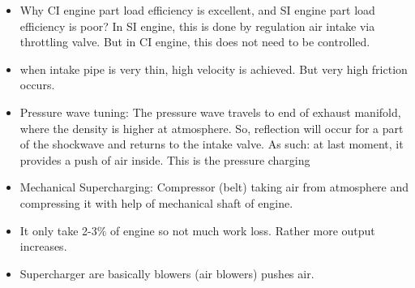 \documentclass{article}
\begin{document}
\begin{multicols}{2}
\begin{itemize}
    \item Why CI engine part load efficiency is excellent, and SI engine part load efficiency is poor? In SI engine, this is done by regulation air intake via throttling valve. But in CI engine, this does not need to be controlled.
    \item when intake pipe is very thin, high velocity is achieved. But very high friction occurs.
    \item Pressure wave tuning: The pressure wave travels to end of exhaust manifold, where the density is higher at atmosphere. So, reflection will occur for a part of the shockwave and returns to the intake valve. As such: at last moment, it provides a push of air inside. This is the pressure charging
    \item Mechanical Supercharging: Compressor (belt) taking air from atmosphere and compressing it with help of mechanical shaft of engine.
    \item It only take 2-3\% of engine so not much work loss. Rather more output increases. 
    \item Supercharger are basically blowers (air blowers) pushes air. 
  \end{itemize}
\end{multicols}
\end{document}
